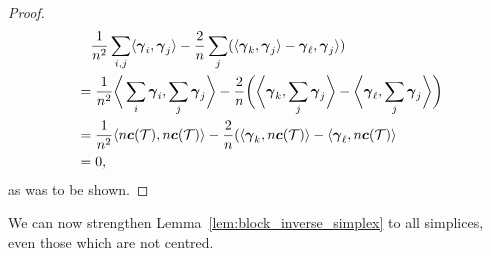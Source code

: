 \begin{proof}
	\begin{align*}
	&\quad \frac{1}{n^2}\sum_{i,j} \langle \vb*{\gamma}_i,\vb*{\gamma}_j\rangle - \frac{2}{n}\sum_j (\langle \vb*{\gamma}_k,\vb*{\gamma}_j\rangle -\vb*{\gamma}_\ell,\vb*{\gamma}_j\rangle) \\
	&= \frac{1}{n^2}\bigg\langle \sum_i\vb*{\gamma}_i,\sum_j\vb*{\gamma}_j\bigg\rangle - \frac{2}{n}\bigg(\bigg\langle \vb*{\gamma}_k,\sum_j\vb*{\gamma}_j\bigg\rangle 
	 -\bigg\langle \vb*{\gamma}_\ell,\sum_j\vb*{\gamma}_j\bigg\rangle\bigg) \\
	&= \frac{1}{n^2}\langle n\vb*{c}(\mathcal{T}),n\vb*{c}(\mathcal{T})\rangle - \frac{2}{n}(\langle \vb*{\gamma}_k,n\vb*{c}(\mathcal{T})\rangle - \langle \vb*{\gamma}_\ell,n\vb*{c}(\mathcal{T})\rangle \\
	&= 0,
	\end{align*}
	as was to  be shown. 
\end{proof}

We can now strengthen  Lemma~\ref{lem:block_inverse_simplex} to all simplices,  even those which  are not centred.   


